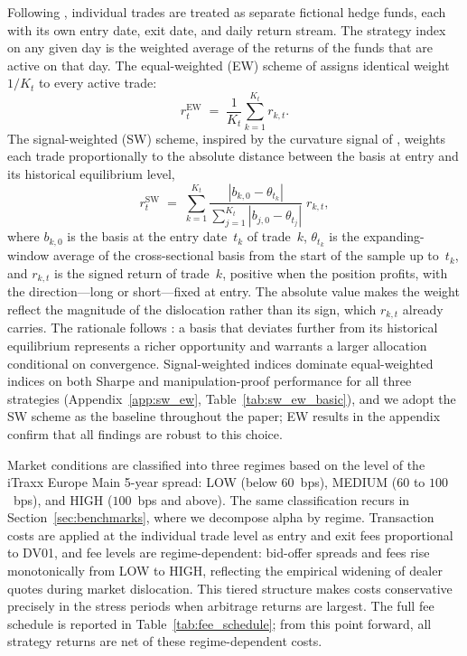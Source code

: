 Following \citet{duarte2007risk}, individual trades are treated as
separate fictional hedge funds, each with its own entry date, exit
date, and daily return stream. The strategy index on any given day is
the weighted average of the returns of the funds that are active on
that day. The equal-weighted (EW) scheme of \citet{duarte2007risk}
assigns identical weight $1/K_t$ to every active trade:
\begin{equation}
r^{\text{EW}}_{t} \;=\; \frac{1}{K_t} \sum_{k=1}^{K_t} r_{k,t}.
\label{eq:ew}
\end{equation}
The signal-weighted (SW) scheme, inspired by the curvature signal of
\citet{rebonato2021convexity}, weights each trade proportionally to
the absolute distance between the basis at entry and its historical
equilibrium level,
\begin{equation}
r^{\text{SW}}_{t} \;=\; \sum_{k=1}^{K_t}
\frac{|b_{k,0} - \theta_{t_k}|}{\sum_{j=1}^{K_t} |b_{j,0} - \theta_{t_j}|}\; r_{k,t},
\label{eq:sw}
\end{equation}
where $b_{k,0}$ is the basis at the entry date~$t_k$ of trade~$k$,
$\theta_{t_k}$ is the expanding-window average of the cross-sectional
basis from the start of the sample up to~$t_k$, and $r_{k,t}$ is the
signed return of trade~$k$, positive when the position profits, with
the direction---long or short---fixed at entry. The absolute value
makes the weight reflect the magnitude of the dislocation rather than
its sign, which $r_{k,t}$ already carries. The rationale follows
\citet{rebonato2021convexity}: a basis that deviates further from its
historical equilibrium represents a richer opportunity and warrants a
larger allocation conditional on convergence. Signal-weighted indices
dominate equal-weighted indices on both Sharpe and manipulation-proof
performance for all three strategies (Appendix~\ref{app:sw_ew},
Table~\ref{tab:sw_ew_basic}), and we adopt the SW scheme as the
baseline throughout the paper; EW results in the appendix confirm that
all findings are robust to this choice.

Market conditions are classified into three regimes based on the level
of the iTraxx Europe Main 5-year spread: LOW (below $60$~bps), MEDIUM
($60$ to $100$~bps), and HIGH ($100$~bps and above). The same
classification recurs in Section~\ref{sec:benchmarks}, where we
decompose alpha by regime. Transaction costs are applied at the
individual trade level as entry and exit fees proportional to DV01,
and fee levels are regime-dependent: bid-offer spreads and fees rise
monotonically from LOW to HIGH, reflecting the empirical widening of
dealer quotes during market dislocation. This tiered structure makes
costs conservative precisely in the stress periods when arbitrage
returns are largest. The full fee schedule is reported in
Table~\ref{tab:fee_schedule}; from this point forward, all strategy
returns are net of these regime-dependent costs.


